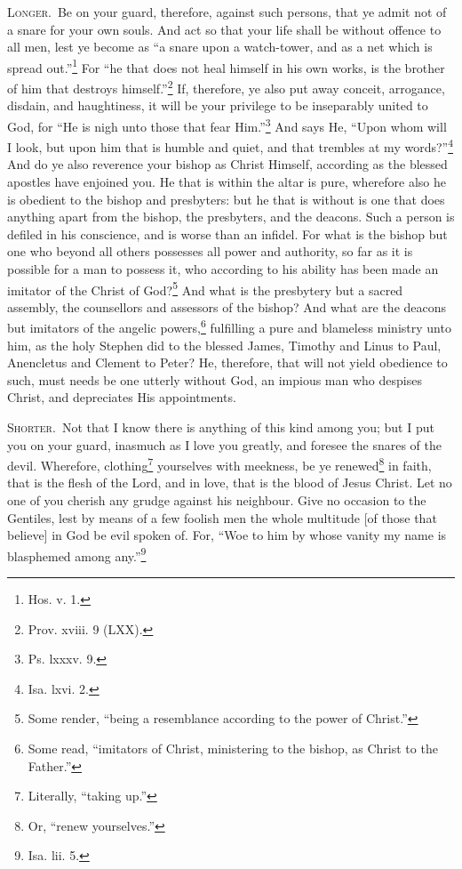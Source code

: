 \textsc{Longer.}~Be on your guard, therefore, against such persons, that ye admit not of a snare for your own souls. And act so that your life shall be without offence to all men, lest ye become as “a snare upon a watch-tower, and as a net which is spread out.”\footnote{Hos. v. 1.} For “he that does not heal himself in his own works, is the brother of him that destroys himself.”\footnote{Prov. xviii. 9 (LXX).} If, therefore, ye also put away conceit, arrogance, disdain, and haughtiness, it will be your privilege to be inseparably united to God, for “He is nigh unto those that fear Him.”\footnote{Ps. lxxxv. 9.} And says He, “Upon whom will I look, but upon him that is humble and quiet, and that trembles at my words?”\footnote{Isa. lxvi. 2.} And do ye also reverence your bishop as Christ Himself, according as the blessed apostles have enjoined you. He that is within the altar is pure, wherefore also he is obedient to the bishop and presbyters: but he that is without is one that does anything apart from the bishop, the presbyters, and the deacons. Such a person is defiled in his conscience, and is worse than an infidel. For what is the bishop but one who beyond all others possesses all power and authority, so far as it is possible for a man to possess it, who according to his ability has been made an imitator of the Christ of God?\footnote{Some render, “being a resemblance according to the power of Christ.”} And what is the presbytery but a sacred assembly, the counsellors and assessors of the bishop? And what are the deacons but imitators of the angelic powers,\footnote{Some read, “imitators of Christ, ministering to the bishop, as Christ to the Father.”} fulfilling a pure and blameless ministry unto him, as the holy Stephen did to the blessed James, Timothy and Linus to Paul, Anencletus and Clement to Peter? He, therefore, that will not yield obedience to such, must needs be one utterly without God, an impious man who despises Christ, and depreciates His appointments.


\textsc{Shorter.}~Not that I know there is anything of this kind among you; but I put you on your guard, inasmuch as I love you greatly, and foresee the snares of the devil. Wherefore, clothing\footnote{Literally, “taking up.”} yourselves with meekness, be ye renewed\footnote{Or, “renew yourselves.”} in faith, that is the flesh of the Lord, and in love, that is the blood of Jesus Christ. Let no one of you cherish any grudge against his neighbour. Give no occasion to the Gentiles, lest by means of a few foolish men the whole multitude [of those that believe] in God be evil spoken of. For, “Woe to him by whose vanity my name is blasphemed among any.”\footnote{Isa. lii. 5.}

